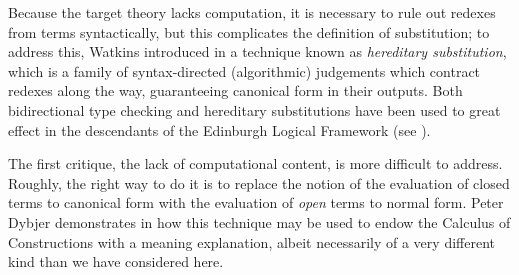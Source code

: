 Because the target theory lacks computation, it is necessary to rule out
redexes from terms syntactically, but this complicates the definition of
substitution; to address this, Watkins introduced in \cite{watkins} a technique
known as \emph{hereditary substitution}, which is a family of syntax-directed
(algorithmic) judgements which contract redexes along the way, guaranteeing
canonical form in their outputs. Both bidirectional type checking and
hereditary substitutions have been used to great effect in the descendants of
the Edinburgh Logical Framework (see \cite{Harper-Licata-2007}).

The first critique, the lack of computational content, is more difficult to
address. Roughly, the right way to do it is to replace the notion of the
evaluation of closed terms to canonical form with the evaluation of \emph{open}
terms to normal form. Peter Dybjer demonstrates in \cite{series/leus/Dybjer12a}
how this technique may be used to endow the Calculus of Constructions with a
meaning explanation, albeit necessarily of a very different kind than we have
considered here.

